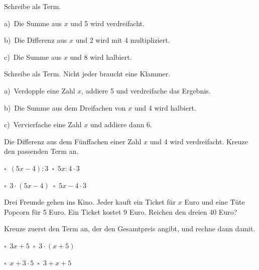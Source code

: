 \documentclass[11pt]{article}
\makeatletter
\renewcommand{\kreuz}[1]{\mbox{$\square$\ #1}\quad}
\newcommand{\aufg}[3]{\par\noindent\makebox[0pt][r]{#3}\begin{minipage}[t]{\linewidth}#1\end{minipage}\par}
\newcommand{\nr}[1]{\makebox[7mm][l]{\textbf{#1}}}
\newlength{\kr}
\newcommand{\karomerk}[2]{\protected@write\@auxout{}{\string\karoseite{#1}{#2}{\thepage}}}
\newcommand{\karoseite}[3]{\expandafter\xdef\csname karo@#1@#2\endcsname{#3}}
\makeatother
\begin{document}
\aufg{\nr{1.}Schreibe als Term. \par a)~Die Summe aus $x$ und 5 wird verdreifacht. \par b)~Die Differenz aus $x$ und 2 wird mit 4 multipliziert. \par c)~Die Summe aus $x$ und 8 wird halbiert.}{}{}
\medskip
\aufg{\nr{2.}Schreibe als Term. Nicht jeder braucht eine Klammer. \par a)~Verdopple eine Zahl $x$, addiere 5 und verdreifache das Ergebnis. \par b)~Die Summe aus dem Dreifachen von $x$ und 4 wird halbiert. \par c)~Vervierfache eine Zahl $x$ und addiere dann 6.}{}{}
\medskip
\aufg{\nr{3.}Die Differenz aus dem Fünffachen einer Zahl $x$ und 4 wird verdreifacht. Kreuze den passenden Term an.\par\smallskip\leftskip7mm \kreuz{$(5x - 4) : 3$}\ \kreuz{$5x : 4 \cdot 3$}\par\kreuz{$3 \cdot (5x - 4)$}\ \kreuz{$5x - 4 \cdot 3$}}{}{}
\medskip
\aufg{\nr{4.}Drei Freunde gehen ins Kino. Jeder kauft ein Ticket für $x$ Euro und eine Tüte Popcorn für 5 Euro. Ein Ticket kostet 9 Euro. Reichen den dreien 40 Euro? \par Kreuze zuerst den Term an, der den Gesamtpreis angibt, und rechne dann damit.\par\smallskip\leftskip7mm \kreuz{$3x + 5$}\ \kreuz{$3 \cdot (x + 5)$}\par\kreuz{$x + 3 \cdot 5$}\ \kreuz{$3 + x + 5$}}{}{{\scriptsize\color{mbgrau}Ziel\hspace{2mm}}}
\medskip
\par\vspace{3mm}\setlength{\kr}{\dimexpr\pagegoal-\pagetotal-10mm\relax}%
\ifdim\kr>12mm\karomerk{k}{B}\noindent{\scriptsize\color{mbgrau}Platz zum Rechnen}\par\nointerlineskip\vspace{1mm}\noindent
\begin{tikzpicture}\clip (0,0) rectangle ({\linewidth-0.5mm},\kr);\draw[black!16,line width=0.3pt,step=5mm] (0,0) grid (\linewidth,\kr);\end{tikzpicture}\fi\par
\clearpage\label{s:C}\noindent\colorbox{black!12}{}\hspace{3mm}{\Large\bfseries Term zur Figur: Umfang und Flächeninhalt}\par\smallskip
\end{document}
